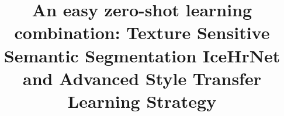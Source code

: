 \documentclass[a4paper,fleqn]{cas-dc}
\begin{document}
\let\WriteBookmarks\relax
\def\floatpagepagefraction{1}
\def\textpagefraction{.001}



\title[mode = title]{An easy zero-shot learning combination: Texture Sensitive Semantic Segmentation IceHrNet and Advanced Style Transfer Learning Strategy}  



%







\end{document}
